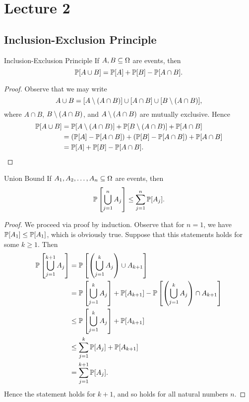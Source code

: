 \documentclass[class=article, crop=false]{standalone}
\begin{document}
  \section{Lecture 2}
  \subsection{Inclusion-Exclusion Principle}
  \begin{theorem}{Inclusion-Exclusion Principle}
    If $A, B\sse\Omega$ are events, then
    \[
      \P[A\cup B] = \P[A] + \P[B] - \P[A\cap B].
    \]
    \begin{proof}
      Observe that we may write
      \[
        A\cup B = [A\sm(A\cap B)]\cup[A\cap B]\cup[B\sm(A\cap B)],
      \]
      where $A\cap B$, $B\sm(A\cap B)$, and $A\sm (A\cap B)$ are mutually exclusive. Hence
      \begin{align*}
        \P[A\cup B] &= \P[A\sm(A\cap B)] + \P[B\sm(A\cap B)] + \P[A\cap B] \\
                    &= (\P[A] - \P[A\cap B]) + (\P[B] - \P[A\cap B]) + \P[A\cap B] \\
                    &= \P[A] + \P[B] - \P[A\cap B].
      \end{align*}
    \end{proof}
  \end{theorem}
  \begin{theorem}{Union Bound}
    If $A_1, A_2,\dotsc,A_n\sse\Omega$ are events, then
    \[
      \P\left[\bigcup_{j = 1}^nA_j\right] \leq \sum_{j=1}^{n}\P[A_j].
    \]
    \begin{proof}
      We proceed via proof by induction. Observe that for $n = 1$, we have $\P[A_1]\leq \P[A_1]$, which is obviously true. Suppose that this statements holds for some $k\geq 1$. Then
      \begin{align*}
        \P\left[\bigcup_{j = 1}^{k + 1}A_j\right] &= \P\left[\paren{\bigcup_{j = 1}^kA_j}\cup A_{k + 1}\right] \\
                                                  &= \P\left[\bigcup_{j = 1}^kA_j\right] + \P[A_{k + 1}] - \P\left[\paren{\bigcup_{j = 1}^kA_j}\cap A_{k + 1}\right] \\
                                                  &\leq \P\left[\bigcup_{j = 1}^kA_j\right] + \P[A_{k + 1}] \\
                                                  &\leq \sum_{j=1}^{k}\P[A_j] + \P[A_{k + 1}] \\
                                                  &= \sum_{j=1}^{k + 1}\P[A_j].
      \end{align*}
      Hence the statement holds for $k + 1$, and so holds for all natural numbers $n$.
    \end{proof}
  \end{theorem}
\end{document}
